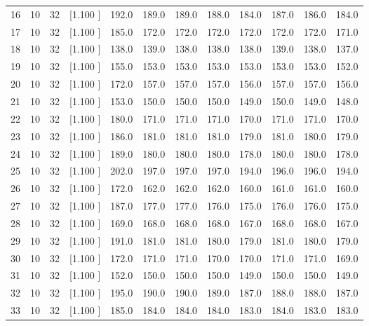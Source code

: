 \documentclass[12pt,a4paper]{article}
\begin{document}
\begin{center}
{\begin{tabular}{r r r r r r r r r r r r}
  16& 10& 32&[1.100     ]&   192.0&   189.0&   189.0&   188.0&   184.0&   187.0&   186.0&   184.0\\[-0.02in]
  17& 10& 32&[1.100     ]&   185.0&   172.0&   172.0&   172.0&   172.0&   172.0&   172.0&   171.0\\[-0.02in]
  18& 10& 32&[1.100     ]&   138.0&   139.0&   138.0&   138.0&   138.0&   139.0&   138.0&   137.0\\[-0.02in]
  19& 10& 32&[1.100     ]&   155.0&   153.0&   153.0&   153.0&   153.0&   153.0&   153.0&   152.0\\[-0.02in]
  20& 10& 32&[1.100     ]&   172.0&   157.0&   157.0&   157.0&   156.0&   157.0&   157.0&   156.0\\[-0.02in]
  21& 10& 32&[1.100     ]&   153.0&   150.0&   150.0&   150.0&   149.0&   150.0&   149.0&   148.0\\[-0.02in]
  22& 10& 32&[1.100     ]&   180.0&   171.0&   171.0&   171.0&   170.0&   171.0&   171.0&   170.0\\[-0.02in]
  23& 10& 32&[1.100     ]&   186.0&   181.0&   181.0&   181.0&   179.0&   181.0&   180.0&   179.0\\[-0.02in]
  24& 10& 32&[1.100     ]&   189.0&   180.0&   180.0&   180.0&   178.0&   180.0&   180.0&   178.0\\[-0.02in]
  25& 10& 32&[1.100     ]&   202.0&   197.0&   197.0&   197.0&   194.0&   196.0&   196.0&   194.0\\[-0.02in]
  26& 10& 32&[1.100     ]&   172.0&   162.0&   162.0&   162.0&   160.0&   161.0&   161.0&   160.0\\[-0.02in]
  27& 10& 32&[1.100     ]&   187.0&   177.0&   177.0&   176.0&   175.0&   176.0&   176.0&   175.0\\[-0.02in]
  28& 10& 32&[1.100     ]&   169.0&   168.0&   168.0&   168.0&   167.0&   168.0&   168.0&   167.0\\[-0.02in]
  29& 10& 32&[1.100     ]&   191.0&   181.0&   181.0&   180.0&   179.0&   181.0&   180.0&   179.0\\[-0.02in]
  30& 10& 32&[1.100     ]&   172.0&   171.0&   171.0&   170.0&   170.0&   171.0&   171.0&   169.0\\[-0.02in]
  31& 10& 32&[1.100     ]&   152.0&   150.0&   150.0&   150.0&   149.0&   150.0&   150.0&   149.0\\[-0.02in]
  32& 10& 32&[1.100     ]&   195.0&   190.0&   190.0&   189.0&   187.0&   188.0&   188.0&   187.0\\[-0.02in]
  33& 10& 32&[1.100     ]&   185.0&   184.0&   184.0&   184.0&   183.0&   184.0&   183.0&   183.0\\[-0.02in]

\end{tabular}}
\end{center}
\end{document}
